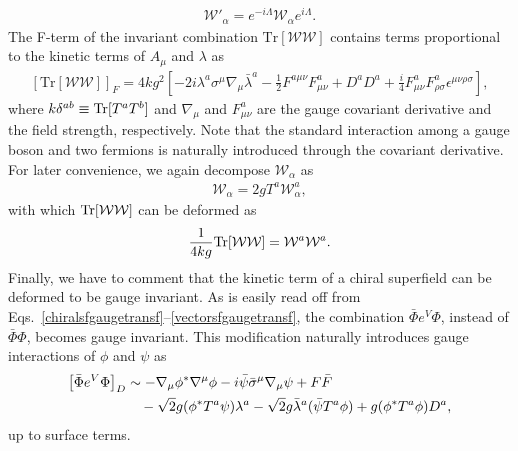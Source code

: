 \documentclass[12pt,twoside,book]{article}
\begin{document}
\begin{align}
 \mathcal{W}'_\alpha = e^{-i\Lambda} \mathcal{W}_\alpha e^{i\Lambda}.
\end{align}
The F-term of the invariant combination $\mathrm{Tr}[\mathcal{W}\mathcal{W}]$ contains terms proportional to the kinetic terms of $A_\mu$ and $\lambda$ as
\begin{align}
 \left[ \mathrm{Tr}[\mathcal{W}\mathcal{W}] \right]_F = 4kg^2 \left[
 -2i\lambda^a \sigma^\mu \nabla_\mu \bar{\lambda}^a - \frac{1}{2}
 F^{a\mu\nu} F^a_{\mu\nu} + D^a D^a + \frac{i}{4} F^a_{\mu\nu}
 F^a_{\rho \sigma} \epsilon^{\mu\nu\rho\sigma} \right],\label{trwawa}
\end{align}
where $k\delta^{ab} \equiv {\rm Tr}[T^a T^b]$ and $\nabla_\mu$ and $F^a_{\mu\nu}$ are the gauge covariant derivative and the field strength, respectively.
Note that the standard interaction among a gauge boson and two fermions is naturally introduced through the covariant derivative.
For later convenience, we again decompose $\mathcal{W}_\alpha$ as
\begin{align}
 \mathcal{W}_\alpha = 2g T^a \mathcal{W}^a_\alpha,
\end{align}
with which ${\rm Tr}[\mathcal{W}\mathcal{W}]$ can be deformed as
\begin{align}
  \frac{1}{4kg} {\rm Tr}[\mathcal{W}\mathcal{W}] = \mathcal{W}^a \mathcal{W}^a.
\end{align}
Finally, we have to comment that the kinetic term of a chiral superfield can be deformed to be gauge invariant.
As is easily read off from Eqs.~\eqref{chiralsfgaugetransf}--\eqref{vectorsfgaugetransf}, the combination $\bar{\Phi} e^V \Phi$, instead of $\bar{\Phi} \Phi$, becomes gauge invariant.
This modification naturally introduces gauge interactions of $\phi$ and $\psi$ as
\begin{align}
 \left[ \bar{\Phi} e^V \Phi \right]_D &\sim -\nabla_\mu \phi^{*}
 \nabla^\mu \phi -i \bar{\psi} \bar{\sigma}^\mu \nabla_\mu \psi +
 F\bar{F} \notag \\
 &\quad -\sqrt{2} g(\phi^{*} T^a \psi) \lambda^a - \sqrt{2} g
 \bar{\lambda}^a (\bar{\psi} T^a \phi) + g(\phi^{*} T^a \phi) D^a,\label{chiralkinetic}
\end{align}
up to surface terms.
\end{document}
